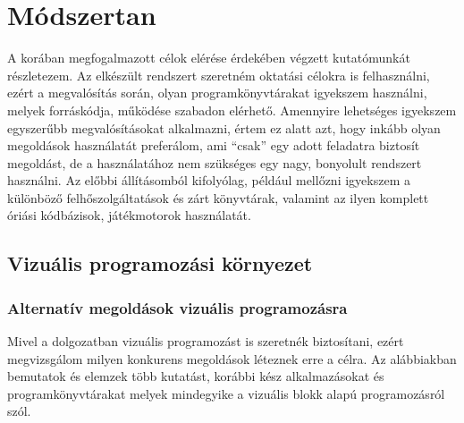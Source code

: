 \documentclass[12pt,a4paper,oneside]{report} %
\begin{document}

\chapter{Módszertan}
\label{modtan}
A korában megfogalmazott célok elérése érdekében végzett kutatómunkát részletezem.
Az elkészült rendszert szeretném oktatási célokra is felhasználni, ezért a megvalósítás során, olyan programkönyvtárakat igyekszem használni,  melyek forráskódja, működése szabadon elérhető. Amennyire lehetséges igyekszem egyszerűbb megvalósításokat alkalmazni, értem ez alatt azt, hogy inkább olyan megoldások használatát preferálom, ami ``csak'' egy adott feladatra biztosít megoldást, de a használatához nem szükséges egy nagy, bonyolult rendszert használni. Az előbbi állításomból kifolyólag, például mellőzni igyekszem a különböző felhőszolgáltatások és zárt könyvtárak, valamint az ilyen komplett óriási kódbázisok, játékmotorok használatát.
\section{Vizuális programozási környezet}
\subsection{Alternatív megoldások vizuális programozásra}
\label{vizuprogkor}
Mivel a dolgozatban vizuális  programozást  is szeretnék biztosítani, ezért megvizsgálom milyen konkurens megoldások léteznek erre a célra. Az alábbiakban bemutatok és elemzek több kutatást, korábbi kész alkalmazásokat és programkönyvtárakat melyek mindegyike a vizuális blokk alapú programozásról szól.
\end{document}
